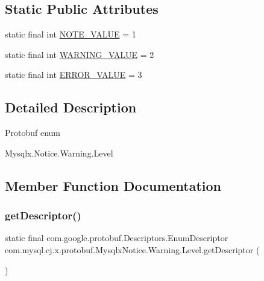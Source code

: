 \subsection*{Static Public Attributes}
\begin{DoxyCompactItemize}
\item 
static final int \mbox{\hyperlink{enumcom_1_1mysql_1_1cj_1_1x_1_1protobuf_1_1_mysqlx_notice_1_1_warning_1_1_level_a88e0dedd605ca8867bb65dee9910cc62}{N\+O\+T\+E\+\_\+\+V\+A\+L\+UE}} = 1
\item 
static final int \mbox{\hyperlink{enumcom_1_1mysql_1_1cj_1_1x_1_1protobuf_1_1_mysqlx_notice_1_1_warning_1_1_level_a0d79b3c8792db796b1f8d1384633ffa8}{W\+A\+R\+N\+I\+N\+G\+\_\+\+V\+A\+L\+UE}} = 2
\item 
static final int \mbox{\hyperlink{enumcom_1_1mysql_1_1cj_1_1x_1_1protobuf_1_1_mysqlx_notice_1_1_warning_1_1_level_a17c14cef844a02a2cfcdfd5dfc523325}{E\+R\+R\+O\+R\+\_\+\+V\+A\+L\+UE}} = 3
\end{DoxyCompactItemize}


\subsection{Detailed Description}
Protobuf enum
\begin{DoxyCode}
Mysqlx.Notice.Warning.Level 
\end{DoxyCode}
 

\subsection{Member Function Documentation}
\mbox{\label{enumcom_1_1mysql_1_1cj_1_1x_1_1protobuf_1_1_mysqlx_notice_1_1_warning_1_1_level_aec392f8349f8ef7b775b76921c54af4a}} 
\subsubsection{\texorpdfstring{get\+Descriptor()}{getDescriptor()}}
{\footnotesize\ttfamily static final com.\+google.\+protobuf.\+Descriptors.\+Enum\+Descriptor com.\+mysql.\+cj.\+x.\+protobuf.\+Mysqlx\+Notice.\+Warning.\+Level.\+get\+Descriptor (\begin{DoxyParamCaption}{ }\end{DoxyParamCaption})\hspace{0.3cm}{\ttfamily [static]}}

